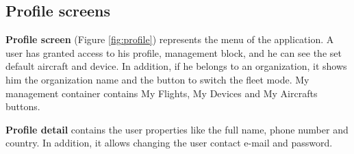 \subsection{Profile screens}\label{subsec:profile-screens}
\textbf{Profile screen} (Figure \ref{fig:profile}) represents the menu of the application.
A user has granted access to his profile, management block, and he can see the set default aircraft and device.
In addition, if he belongs to an organization, it shows him the organization name and the button to switch the fleet mode.
My management container contains My Flights, My Devices and My Aircrafts buttons.

\textbf{Profile detail} contains the user properties like the full name, phone number and country.
In addition, it allows changing the user contact e-mail and password.


